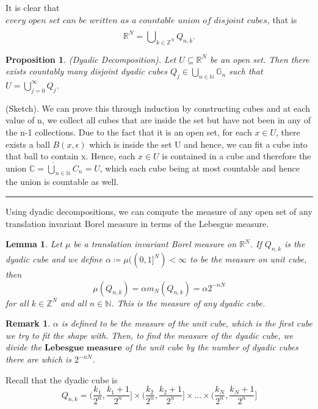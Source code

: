 \documentclass[twoside]{article}
\newtheorem{lemma}[theorem]{Lemma}
\newtheorem{proposition}[theorem]{Proposition}
\newtheorem{remark}[theorem]{Remark}
\newenvironment{proof}{{\bf Proof:}}{\hfill\rule{2mm}{2mm}}
\begin{document}
It is clear that $\textit{every open set can be written as a countable union of disjoint cubes}$, that is
$$
\mathbb{R}^N = \dot{\bigcup}_{k \in \mathbb{Z}^N}Q_{n,k}.
$$

\begin{proposition}
(Dyadic Decomposition). Let $U \subseteq \mathbb{R}^N$ be an open set. Then there exists countably many disjoint dyadic cubes $Q_j \in \bigcup_{n \in \mathbb{N}}\mathbb{G}_n $ such that $U = \bigcup_{j=0}^{\infty}Q_j$.
\end{proposition}

\begin{proof}
(Sketch). We can prove this through induction by constructing cubes and at each value of n, we collect all cubes that are inside the set but have not been in any of the n-1 collections. Due to the fact that it is an open set, for each $x \in U$, there exists a ball $B(x,\epsilon)$ which is inside the set U and hence, we can fit a cube into that ball to contain x. Hence, each $x \in U$ is contained in a cube and therefore the union $\mathbb{C} = \dot{\bigcup}_{n \in \mathbb{N}}C_n = U$, which each cube being at most countable and hence the union is countable as well.
\end{proof}

Using dyadic decompositions, we can compute the measure of any open set of any translation invariant Borel measure in terms of the Lebesgue measure.

\begin{lemma}
Let $\mu$ be a translation invariant Borel measure on $\mathbb{R}^N$. If $Q_{n,k}$ is the dyadic cube and we define $\alpha \coloneqq \mu((0,1]^N) < \infty$ to be the measure on unit cube, then 
$$
\mu(Q_{n,k}) = \alpha m_N(Q_{n,k}) = \alpha 2^{-nN}
$$
for all $k \in \mathbb{Z}^N$ and all $n \in \mathbb{N}$. This is the measure of any dyadic cube.
\end{lemma}

\begin{remark}
$\alpha$ is defined to be the measure of the unit cube, which is the first cube we try to fit the shape with.  Then, to find the measure of the dyadic cube, we divide the $\textbf{Lebesgue measure}$ of the unit cube by the number of dyadic cubes there are which is $2^{-nN}$.
\end{remark}

Recall that the dyadic cube is
$$
Q_{n,k} = (\frac{k_1}{2^n},\frac{k_1+1}{2^n}] \times (\frac{k_2}{2^n},\frac{k_2+1}{2^n}] \times ... \times (\frac{k_N}{2^n},\frac{k_N+1}{2^n}]
$$
\end{document}
